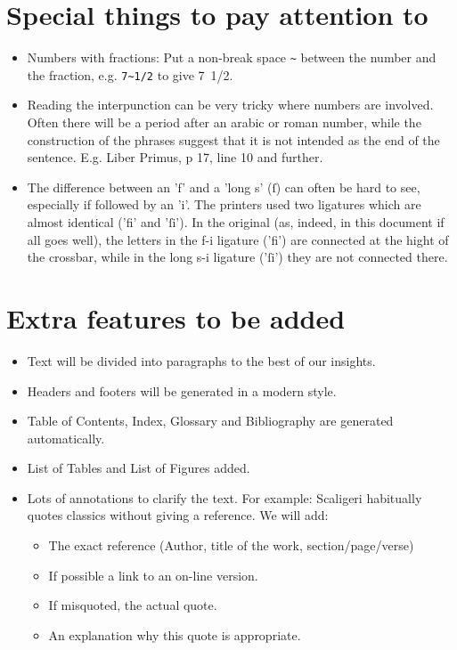 \documentclass{report}
\begin{document}
\section{Special things to pay attention to}
\begin{itemize}
\item Numbers with fractions: Put a non-break space \verb+~+ between the number
and the fraction, e.g. \verb+7~1/2+ to give 7~1/2.
\item Reading the interpunction can be very tricky where numbers are involved.
Often there will be a period after an arabic or roman number, while the
construction of the phrases suggest that it is not intended as the end of 
the sentence. E.g. Liber Primus, p 17, line 10 and further.
\item The difference between an 'f' and a 'long s' (ſ) can often be hard to see, especially if followed by an 'i'. The printers used two ligatures which are almost identical ('fi' and 'ſi'). In the original (as, indeed, in this document if all goes well), the letters in the f-i ligature ('fi') are connected at the hight of the crossbar, while in the long s-i ligature ('ſi') they are not connected there.
\end{itemize}

\section{Extra features to be added}
\begin{itemize}
\item Text will be divided into paragraphs to the best of our insights.
\item Headers and footers will be generated in a modern style.
\item Table of Contents, Index, Glossary and Bibliography are generated
automatically.
\item List of Tables and List of Figures added.
\item Lots of annotations to clarify the text.
For example: Scaligeri habitually quotes classics without giving a reference.
We will add:
    \begin{itemize}
    \item The exact reference (Author, title of the work, section/page/verse)
    \item If possible a link to an on-line version.
    \item If misquoted, the actual quote.
    \item An explanation why this quote is appropriate.
    \end{itemize}
\end{itemize}
\end{document}
